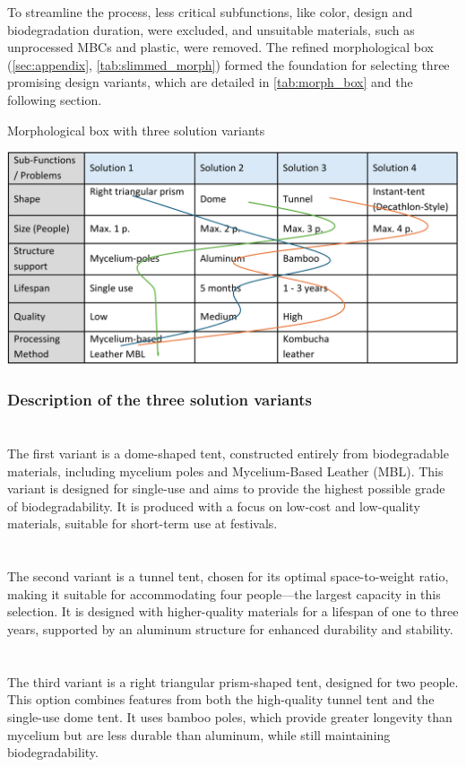 \documentclass{article}
\newcommand{\pph}[1]{\paragraph{#1} \phantom{}\\}
\begin{document}
To streamline the process, less critical subfunctions, like color, design and
biodegradation duration, were excluded, and unsuitable materials, such as unprocessed
MBCs and plastic, were removed. The refined
morphological box (\autoref{sec:appendix}, \autoref{tab:slimmed_morph}) formed the foundation
for selecting three promising design variants, which are detailed in \autoref{tab:morph_box}
and the following section. 

\begin{table}[ht!]
    \centering
    \caption{Morphological box with three solution variants}
    \includegraphics[width=.85\textwidth]{media/morph_box.png}
    \label{tab:morph_box}
\end{table}

\subsubsection{Description of the three solution variants}
\pph{\color{newgreen}{Variant 1: Dome tent (Single use, Fully biodegradable)}}
The first variant is a dome-shaped tent, constructed entirely from biodegradable materials,
including mycelium poles and Mycelium-Based Leather (MBL). This variant is designed for
single-use and aims to provide the highest possible grade of biodegradability. It is produced
with a focus on low-cost and low-quality materials, suitable for short-term use at festivals.

\pph{\color{neworange}{Variant 2: Tunnel tent (Four-person, Long-lasting)}}
The second variant is a tunnel tent, chosen for its optimal space-to-weight ratio, making it
suitable for accommodating four people—the largest capacity in this selection. It is designed
with higher-quality materials for a lifespan of one to three years, supported by an aluminum
structure for enhanced durability and stability.

\pph{\color{newblue}{Variant 3: Triangular prism tent (Two-person, Medium-lasting)}}
The third variant is a right triangular prism-shaped tent, designed for two people. This option
combines features from both the high-quality tunnel tent and the single-use dome tent. It
uses bamboo poles, which provide greater longevity than mycelium but are less durable
than aluminum, while still maintaining biodegradability.
\end{document}
